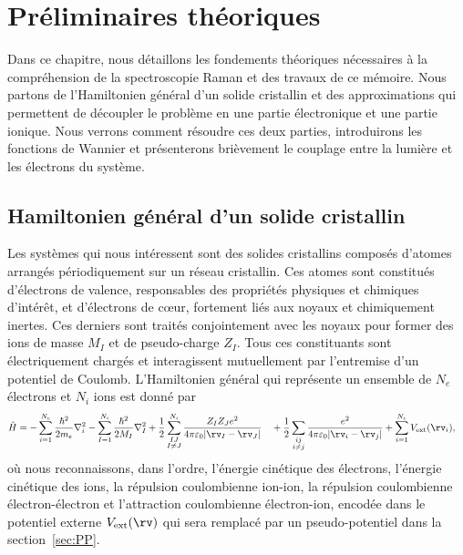 \chapter{Préliminaires théoriques}\label{chap:théorie}

Dans ce chapitre, nous détaillons les fondements théoriques nécessaires à la compréhension de la spectroscopie Raman et des travaux de ce mémoire. Nous partons de l'Hamiltonien général d'un solide cristallin et des approximations qui permettent de découpler le problème en une partie électronique et une partie ionique. Nous verrons comment résoudre ces deux parties, introduirons les fonctions de Wannier et présenterons brièvement le couplage entre la lumière et les électrons du système. 

\section{Hamiltonien général d'un solide cristallin}\label{sec:H_général}

Les systèmes qui nous intéressent sont des solides cristallins composés d'atomes arrangés périodiquement sur un réseau cristallin. Ces atomes sont constitués d'électrons de valence, responsables des propriétés physiques et chimiques d'intérêt, et d'électrons de c\oe ur, fortement liés aux noyaux et chimiquement inertes. Ces derniers sont traités conjointement avec les noyaux pour former des ions de masse $M_{I}$ et de pseudo-charge $Z_{I}$. Tous ces constituants sont électriquement chargés et interagissent mutuellement par l'entremise d'un potentiel de Coulomb. L'Hamiltonien général qui représente un ensemble de $N_e$ électrons et $N_i$ ions est donné par
\begin{equation}
\begin{split}
    \hat{H} &= -\sum_{i=1}^{N_e}\frac{\hbar^2}{2m_e}\nabla_i^2
        -\sum_{I=1}^{N_i}\frac{\hbar^2}{2M_I}\nabla_I^2
        +\frac{1}{2}\sum_{\substack{IJ \\ I\neq J}}^{N_i}
        \frac{Z_IZ_Je^2}{4\pi\varepsilon_0|\rv_I-\rv_J|} 
      \quad +\frac{1}{2}\sum_{\substack{ij \\ i\neq j}}
        \frac{e^2}{4\pi\varepsilon_0|\rv_i-\rv_j|}+\sum_{i=1}^{N_e}V_\text{ext}(\rv_i),
\end{split}
\label{eqn:c2_H_general}
\end{equation}
où nous reconnaissons, dans l'ordre, l'énergie cinétique des électrons, l'énergie cinétique des ions, la répulsion coulombienne ion-ion, la répulsion coulombienne électron-électron et l'attraction coulombienne électron-ion, encodée dans le potentiel externe $V_\text{ext}(\rv)$ qui sera remplacé par un pseudo-potentiel dans la section~\ref{sec:PP}. 

